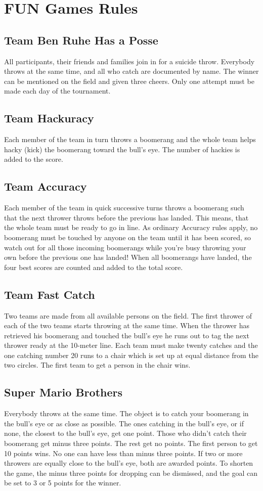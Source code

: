 \section{FUN Games Rules}
\subsection{Team Ben Ruhe Has a Posse}
All participants, their friends and families join in for a suicide throw. Everybody throws at the same time, and all who catch are documented by name. The winner can be mentioned on the field and given three cheers.
Only one attempt must be made each day of the tournament.

\subsection{Team Hackuracy}
Each member of the team in turn throws a boomerang and the whole team helps hacky (kick) the boomerang toward the bull’s eye. The number of hackies is added to the score.

\subsection{Team Accuracy}
Each member of the team in quick successive turns throws a boomerang such that the next thrower throws before the previous has landed. This means, that the whole team must be ready to go in line. As ordinary Accuracy rules apply, no boomerang must be touched by anyone on the team until it has been scored, so watch out for all those incoming boomerangs while you’re busy throwing your own before the previous one has landed! When all boomerangs have landed, the four best scores are counted and added to the total score.

\subsection{Team Fast Catch}
Two teams are made from all available persons on the field. The first thrower of each of the two teams starts throwing at the same time. When the thrower has retrieved his boomerang and touched the bull’s eye he runs out to tag the next thrower ready at the 10-meter line.
Each team must make twenty catches and the one catching number 20 runs to a chair which is set up at equal distance from the two circles. The first team to get a person in the chair wins.

\subsection{Super Mario Brothers}
Everybody throws at the same time. The object is to catch your boomerang in the bull’s eye or as close as possible. The ones catching in the bull’s eye, or if none, the closest to the bull’s eye, get one point. Those who didn’t catch their boomerang get minus three points. The rest get no points. The first person to get 10 points wins. No one can have less than minus three points. If two or more throwers are equally close to the bull’s eye, both are awarded points.
To shorten the game, the minus three points for dropping can be dismissed, and the goal can be set to 3 or 5 points for the winner.

